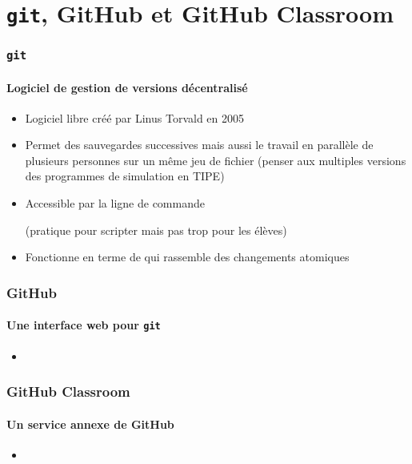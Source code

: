 \section{\texttt{git}, GitHub et GitHub Classroom}

\begin{frame}
\frametitle{\texttt{git}}
\framesubtitle{Logiciel de gestion de versions décentralisé}

\begin{itemize}
	\item	 Logiciel libre créé par Linus Torvald en 2005
	\item  Permet des sauvegardes successives mais aussi le travail en parallèle de plusieurs personnes sur un même jeu de fichier (penser aux multiples versions des programmes de simulation en TIPE)
	\item  Accessible par la ligne de commande

	(pratique pour scripter mais pas trop pour les élèves)
	\item  Fonctionne en terme de  qui rassemble des changements atomiques

\end{itemize}

\end{frame}


\begin{frame}
\frametitle{GitHub}
\framesubtitle{Une interface web pour \texttt{git}}

\begin{itemize}
	\item	<1->

\end{itemize}

\end{frame}


\begin{frame}
\frametitle{GitHub Classroom}
\framesubtitle{Un service annexe de GitHub}

\begin{itemize}
	\item	<1->

\end{itemize}

\end{frame}
